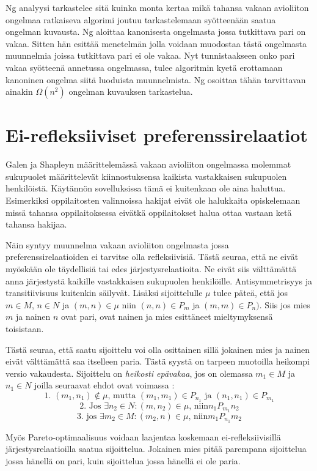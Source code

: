\documentclass[gradu, twoside]{tktltiki}
\begin{document}
Ng analyysi tarkastelee sitä kuinka monta kertaa mikä tahansa vakaan
avioliiton ongelmaa ratkaiseva algorimi joutuu tarkastelemaan
syötteenään saatua ongelman kuvausta. Ng aloittaa kanonisesta
ongelmasta jossa tutkittava pari on vakaa. Sitten hän esittää
menetelmän jolla voidaan muodostaa tästä ongelmasta muunnelmia joissa
tutkittava pari ei ole vakaa. Nyt tunnistaakseen onko pari vakaa
syötteenä annetussa ongelmassa, tulee algoritmin kyetä erottamaan
kanoninen ongelma siitä luoduista muunnelmista. Ng osoittaa tähän
tarvittavan ainakin $\Omega(n^2)$ ongelman kuvauksen tarkastelua.
\cite{cheng89}

\section{Ei-refleksiiviset preferenssirelaatiot}

Galen ja Shapleyn määrittelemässä vakaan avioliiton ongelmassa
molemmat sukupuolet määrittelevät kiinnostuksensa kaikista
vastakkaisen sukupuolen henkilöistä. Käytännön sovelluksissa tämä ei
kuitenkaan ole aina haluttua. Esimerkiksi oppilaitosten valinnoissa
hakijat eivät ole halukkaita opiskelemaan missä tahansa
oppilaitoksessa eivätkä oppilaitokset halua ottaa vastaan ketä tahansa
hakijaa.

Näin syntyy muunnelma vakaan avioliiton ongelmasta jossa
preferenssirelaatioiden ei tarvitse olla refleksiivisiä. Tästä seuraa,
että ne eivät myöskään ole täydellisiä tai edes järjestysrelaatioita.
Ne eivät siis välttämättä anna järjestystä kaikille vastakkaisen
sukupuolen henkilöille. Antisymmetrisyys ja transitiivisuus kuitenkin
säilyvät. Lisäksi sijoittelulle $\mu$ tulee päteä, että jos $m \in M$,
$n \in N$ ja $(m, n) \in \mu$ niin $(n, n) \in P_m$ ja $(m, m) \in
P_n)$. Siis jos mies $m$ ja nainen $n$ ovat pari, ovat nainen ja mies
esittäneet mieltymyksensä toisistaan.

Tästä seuraa, että saatu sijoittelu voi olla osittainen sillä jokainen
mies ja nainen eivät välttämättä saa itselleen paria. Tästä syystä on
tarpeen muotoilla heikompi versio vakaudesta. Sijoittelu on
\emph{heikosti epävakaa}, jos on olemassa $m_1 \in M$ ja $n_1 \in N$
joilla seuraavat ehdot ovat voimassa \cite{gusfield89}:
\[
\text{1. }(m_1, n_1) \notin \mu \text{, mutta } (m_1, m_1) \in P_{n_1}
\text{ ja } (n_1, n_1) \in P_{m_1}
\]
\[
\text{2. Jos }\exists n_2 \in N: (m, n_2) \in \mu \text{, niin
}n_1P_{m_1}n_2
\]
\[
\text{3. jos }\exists m_2 \in M: (m_2, n) \in \mu \text{, niin
}m_1P_{n_1}m_2
\]

Myös Pareto-optimaalisuus voidaan laajentaa koskemaan
ei-refleksiivisillä järjestysrelaatioilla saatua sijoittelua. Jokainen
mies pitää parempana sijoittelua jossa hänellä on pari, kuin
sijoittelua jossa hänellä ei ole paria. \cite{gusfield89}
\end{document}
